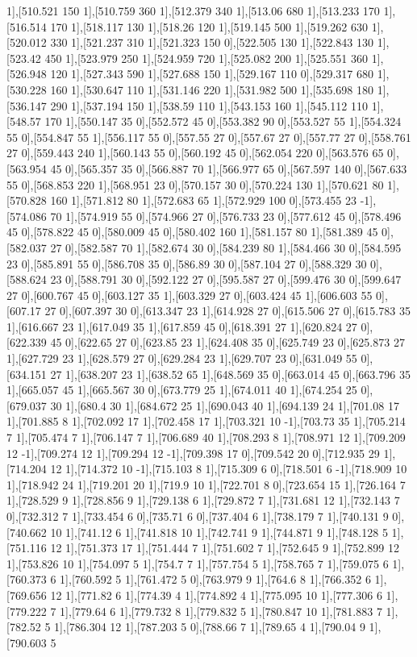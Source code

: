 {1],[510.521 150 1],[510.759 360 1],[512.379 340 1],[513.06 680 1],[513.233 170 1],[516.514 170 1],[518.117 130 1],[518.26 120 1],[519.145 500 1],[519.262 630 1],[520.012 330 1],[521.237 310 1],[521.323 150 0],[522.505 130 1],[522.843 130 1],[523.42 450 1],[523.979 250 1],[524.959 720 1],[525.082 200 1],[525.551 360 1],[526.948 120 1],[527.343 590 1],[527.688 150 1],[529.167 110 0],[529.317 680 1],[530.228 160 1],[530.647 110 1],[531.146 220 1],[531.982 500 1],[535.698 180 1],[536.147 290 1],[537.194 150 1],[538.59 110 1],[543.153 160 1],[545.112 110 1],[548.57 170 1],[550.147 35 0],[552.572 45 0],[553.382 90 0],[553.527 55 1],[554.324 55 0],[554.847 55 1],[556.117 55 0],[557.55 27 0],[557.67 27 0],[557.77 27 0],[558.761 27 0],[559.443 240 1],[560.143 55 0],[560.192 45 0],[562.054 220 0],[563.576 65 0],[563.954 45 0],[565.357 35 0],[566.887 70 1],[566.977 65 0],[567.597 140 0],[567.633 55 0],[568.853 220 1],[568.951 23 0],[570.157 30 0],[570.224 130 1],[570.621 80 1],[570.828 160 1],[571.812 80 1],[572.683 65 1],[572.929 100 0],[573.455 23 -1],[574.086 70 1],[574.919 55 0],[574.966 27 0],[576.733 23 0],[577.612 45 0],[578.496 45 0],[578.822 45 0],[580.009 45 0],[580.402 160 1],[581.157 80 1],[581.389 45 0],[582.037 27 0],[582.587 70 1],[582.674 30 0],[584.239 80 1],[584.466 30 0],[584.595 23 0],[585.891 55 0],[586.708 35 0],[586.89 30 0],[587.104 27 0],[588.329 30 0],[588.624 23 0],[588.791 30 0],[592.122 27 0],[595.587 27 0],[599.476 30 0],[599.647 27 0],[600.767 45 0],[603.127 35 1],[603.329 27 0],[603.424 45 1],[606.603 55 0],[607.17 27 0],[607.397 30 0],[613.347 23 1],[614.928 27 0],[615.506 27 0],[615.783 35 1],[616.667 23 1],[617.049 35 1],[617.859 45 0],[618.391 27 1],[620.824 27 0],[622.339 45 0],[622.65 27 0],[623.85 23 1],[624.408 35 0],[625.749 23 0],[625.873 27 1],[627.729 23 1],[628.579 27 0],[629.284 23 1],[629.707 23 0],[631.049 55 0],[634.151 27 1],[638.207 23 1],[638.52 65 1],[648.569 35 0],[663.014 45 0],[663.796 35 1],[665.057 45 1],[665.567 30 0],[673.779 25 1],[674.011 40 1],[674.254 25 0],[679.037 30 1],[680.4 30 1],[684.672 25 1],[690.043 40 1],[694.139 24 1],[701.08 17 1],[701.885 8 1],[702.092 17 1],[702.458 17 1],[703.321 10 -1],[703.73 35 1],[705.214 7 1],[705.474 7 1],[706.147 7 1],[706.689 40 1],[708.293 8 1],[708.971 12 1],[709.209 12 -1],[709.274 12 1],[709.294 12 -1],[709.398 17 0],[709.542 20 0],[712.935 29 1],[714.204 12 1],[714.372 10 -1],[715.103 8 1],[715.309 6 0],[718.501 6 -1],[718.909 10 1],[718.942 24 1],[719.201 20 1],[719.9 10 1],[722.701 8 0],[723.654 15 1],[726.164 7 1],[728.529 9 1],[728.856 9 1],[729.138 6 1],[729.872 7 1],[731.681 12 1],[732.143 7 0],[732.312 7 1],[733.454 6 0],[735.71 6 0],[737.404 6 1],[738.179 7 1],[740.131 9 0],[740.662 10 1],[741.12 6 1],[741.818 10 1],[742.741 9 1],[744.871 9 1],[748.128 5 1],[751.116 12 1],[751.373 17 1],[751.444 7 1],[751.602 7 1],[752.645 9 1],[752.899 12 1],[753.826 10 1],[754.097 5 1],[754.7 7 1],[757.754 5 1],[758.765 7 1],[759.075 6 1],[760.373 6 1],[760.592 5 1],[761.472 5 0],[763.979 9 1],[764.6 8 1],[766.352 6 1],[769.656 12 1],[771.82 6 1],[774.39 4 1],[774.892 4 1],[775.095 10 1],[777.306 6 1],[779.222 7 1],[779.64 6 1],[779.732 8 1],[779.832 5 1],[780.847 10 1],[781.883 7 1],[782.52 5 1],[786.304 12 1],[787.203 5 0],[788.66 7 1],[789.65 4 1],[790.04 9 1],[790.603 5 }
